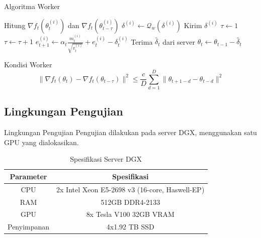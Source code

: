 \documentclass[aspectratio=169]{beamer}
\begin{document}
\begin{frame}{Algoritma Worker}
  \begin{algorithm}[H]
    \begin{algorithmic}[1]
      \State Hitung $\nabla f_t(\theta^{(i)}_{t})$ dan $\nabla f_t(\theta^{(i)}_{t-\tau})$
      \State $\delta^{(i)} \gets \mathcal{Q}_w(\delta^{(i)})$
      \State Kirim $\delta^{(i)}$
      \State $\tau \gets 1$
      \Else
      \State $\tau \gets \tau + 1$
      \EndIf
      \State $e_{t+1}^{(i)} \gets \alpha_t \frac{m_t^{(i)}}{\sqrt{v_t^{(i)}}} + e_t^{(i)} - \delta_t^{(i)}$
      \State Terima $\tilde{\delta_t}$ dari server
      \State $\theta_{t} \gets \theta_{t-1} - \tilde{\delta_t}$
      \EndFor
    \end{algorithmic}
  \end{algorithm}
\end{frame}

\begin{frame}{Kondisi Worker}
  \begin{equation}
    \label{cada2cond}
    \|\nabla f_t(\theta_t) - \nabla f_t(\theta_{t-\tau})\|^2 \leq \frac{c}{D} \sum_{d=1}^{D} \|\theta_{t+1-d} - \theta_{t-d}\|^2
  \end{equation}
\end{frame}

\subsection{Lingkungan Pengujian}
\begin{frame}{Lingkungan Pengujian}
  Pengujian dilakukan pada server DGX, menggunakan satu GPU yang dialokasikan.

  \begin{table}
    \caption{Spesifikasi Server DGX}
    \centering
    \begin{tabular}[ht]{ | c | c | }
      \hline
      \textbf{Parameter} & \textbf{Spesifikasi}                           \\
      \hline
      CPU                & 2x Intel Xeon E5-2698 v3 (16-core, Haswell-EP) \\
      \hline
      RAM                & 512GB DDR4-2133                                \\
      \hline
      GPU                & 8x Tesla V100 32GB VRAM                        \\
      \hline
      Penyimpanan        & 4x1.92 TB SSD                                  \\
      \hline
    \end{tabular}
  \end{table}
\end{frame}
\end{document}
